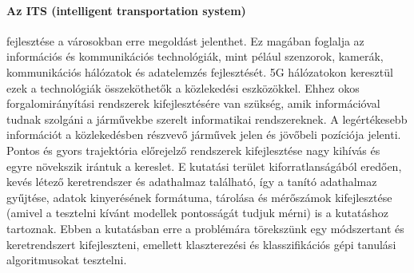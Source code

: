 \documentclass[12pt,a4paper]{article}
\begin{document}
\paragraph{Az ITS (intelligent transportation system)} fejlesztése a városokban erre megoldást jelenthet. Ez magában foglalja az információs és
kommunikációs technológiák, mint pélául szenzorok, kamerák, kommunikációs hálózatok és adatelemzés fejlesztését. 5G hálózatokon
keresztül ezek a technológiák összeköthetők a közlekedési eszközökkel. Ehhez okos forgalomirányítási rendszerek kifejlesztésére
van szükség, amik információval tudnak szolgáni a járművekbe szerelt informatikai rendszereknek.
A legértékesebb információt a közlekedésben részvevő járművek jelen és jövőbeli pozíciója jelenti. Pontos és gyors trajektória
előrejelző rendszerek kifejlesztése nagy kihívás és egyre növekszik irántuk a kereslet. E kutatási terület kiforratlanságából
eredően, kevés létező keretrendszer és adathalmaz található, így a tanító adathalmaz gyűjtése, adatok kinyerésének formátuma, tárolása
és mérőszámok kifejlesztése (amivel a tesztelni kívánt modellek pontosságát tudjuk mérni) is a kutatáshoz tartoznak.
Ebben a kutatásban erre a problémára törekszünk egy módszertant és keretrendszert kifejleszteni, emellett klaszterezési és klasszifikációs
gépi tanulási algoritmusokat tesztelni.
\end{document}
